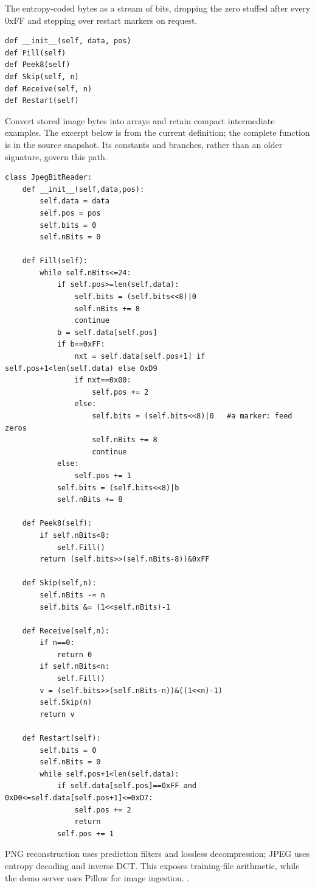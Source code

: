 The entropy-coded bytes as a stream of bits, dropping the zero stuffed after every 0xFF and stepping over restart markers on request.


\begin{lstlisting}[style=plain]
def __init__(self, data, pos)
def Fill(self)
def Peek8(self)
def Skip(self, n)
def Receive(self, n)
def Restart(self)
\end{lstlisting}
Convert stored image bytes into arrays and retain compact intermediate examples. The excerpt below is from the current definition; the complete function is in the source snapshot. Its constants and branches, rather than an older signature, govern this path.


\begin{lstlisting}[style=plain]
class JpegBitReader:
    def __init__(self,data,pos):
        self.data = data
        self.pos = pos
        self.bits = 0
        self.nBits = 0

    def Fill(self):
        while self.nBits<=24:
            if self.pos>=len(self.data):
                self.bits = (self.bits<<8)|0
                self.nBits += 8
                continue
            b = self.data[self.pos]
            if b==0xFF:
                nxt = self.data[self.pos+1] if self.pos+1<len(self.data) else 0xD9
                if nxt==0x00:
                    self.pos += 2
                else:
                    self.bits = (self.bits<<8)|0   #a marker: feed zeros
                    self.nBits += 8
                    continue
            else:
                self.pos += 1
            self.bits = (self.bits<<8)|b
            self.nBits += 8

    def Peek8(self):
        if self.nBits<8:
            self.Fill()
        return (self.bits>>(self.nBits-8))&0xFF

    def Skip(self,n):
        self.nBits -= n
        self.bits &= (1<<self.nBits)-1

    def Receive(self,n):
        if n==0:
            return 0
        if self.nBits<n:
            self.Fill()
        v = (self.bits>>(self.nBits-n))&((1<<n)-1)
        self.Skip(n)
        return v

    def Restart(self):
        self.bits = 0
        self.nBits = 0
        while self.pos+1<len(self.data):
            if self.data[self.pos]==0xFF and 0xD0<=self.data[self.pos+1]<=0xD7:
                self.pos += 2
                return
            self.pos += 1
\end{lstlisting}
PNG reconstruction uses prediction filters and lossless decompression; JPEG uses entropy decoding and inverse DCT. This exposes training-file arithmetic, while the demo server uses Pillow for image ingestion. \cite{pngspec,jpegspec,pillowimage}.


